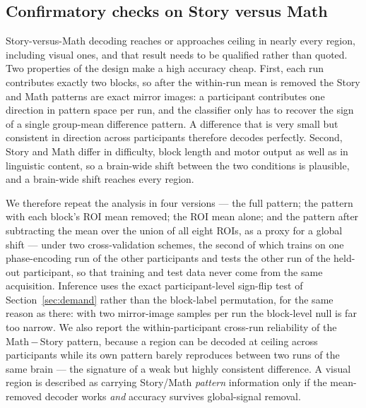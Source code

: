 \documentclass[conference]{IEEEtran}
\begin{document}
\subsection{Confirmatory checks on Story versus Math}
\label{sec:langcheck}
Story-versus-Math decoding reaches or approaches ceiling in nearly every region, including visual ones, and that result needs to be qualified rather than quoted. Two properties of the design make a high accuracy cheap. First, each run contributes exactly two blocks, so after the within-run mean is removed the Story and Math patterns are exact mirror images: a participant contributes one direction in pattern space per run, and the classifier only has to recover the sign of a single group-mean difference pattern. A difference that is very small but consistent in direction across participants therefore decodes perfectly. Second, Story and Math differ in difficulty, block length and motor output as well as in linguistic content, so a brain-wide shift between the two conditions is plausible, and a brain-wide shift reaches every region.

We therefore repeat the analysis in four versions --- the full pattern; the pattern with each block's ROI mean removed; the ROI mean alone; and the pattern after subtracting the mean over the union of all eight ROIs, as a proxy for a global shift --- under two cross-validation schemes, the second of which trains on one phase-encoding run of the other participants and tests the other run of the held-out participant, so that training and test data never come from the same acquisition. Inference uses the exact participant-level sign-flip test of Section~\ref{sec:demand} rather than the block-label permutation, for the same reason as there: with two mirror-image samples per run the block-level null is far too narrow. We also report the within-participant cross-run reliability of the Math\,$-$\,Story pattern, because a region can be decoded at ceiling across participants while its own pattern barely reproduces between two runs of the same brain --- the signature of a weak but highly consistent difference. A visual region is described as carrying Story/Math \emph{pattern} information only if the mean-removed decoder works \emph{and} accuracy survives global-signal removal.
\end{document}
